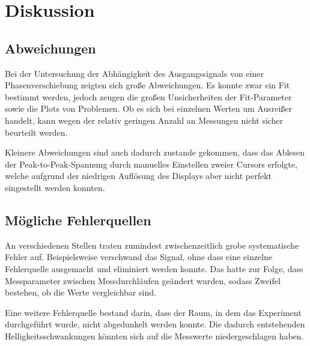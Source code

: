 \section{Diskussion}
\label{sec:diskussion}

\subsection{Abweichungen}
Bei der Untersuchung der Abhängigkeit des Ausgangssignals von einer Phasenverschiebung
zeigten sich große Abweichungen.
Es konnte zwar ein Fit bestimmt werden,
jedoch zeugen die großen Unsicherheiten der Fit-Parameter sowie die Plots von Problemen.
Ob es sich bei einzelnen Werten um Ausreißer handelt,
kann wegen der relativ geringen Anzahl an Messungen nicht sicher beurteilt werden.

Kleinere Abweichungen sind auch dadurch zustande gekommen,
dass das Ablesen der Peak-to-Peak-Spannung durch manuelles Einstellen zweier Cursors erfolgte,
welche aufgrund der niedrigen Auflösung des Displays aber nicht perfekt eingestellt werden konnten.


\subsection{Mögliche Fehlerquellen}
An verschiedenen Stellen traten zumindest zwischenzeitlich grobe systematische Fehler auf.
Beispielsweise verschwand das Signal,
ohne dass eine einzelne Fehlerquelle ausgemacht und eliminiert werden konnte.
Das hatte zur Folge, dass Messparameter zwischen Messdurchläufen geändert wurden,
sodass Zweifel bestehen, ob die Werte vergleichbar sind.

Eine weitere Fehlerquelle bestand darin,
dass der Raum, in dem das Experiment durchgeführt wurde,
nicht abgedunkelt werden konnte.
Die dadurch entstehenden Helligkeitsschwankungen könnten sich auf die Messwerte niedergeschlagen haben.
